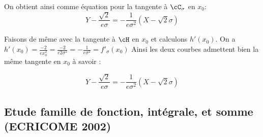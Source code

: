 \begin{correction}
\begin{enumerate}
\begin{enumerate}
On obtient ainsi comme équation pour la tangente à $\cC_\sigma$ en $x_0$:
$$Y- \frac{\sqrt{2}}{e\sigma} = - \frac{1}{e\sigma^2} (X- \sqrt{2}\sigma)$$

Faisons de même avec la tangente à $\cH$ en $x_0$ et calculons $h'(x_0)$. 
On  a $h'(x_0) =\frac{-2}{ex_0^2}= \frac{-2}{e 2 \sigma^2} =- \frac{1}{e\sigma^2} =f'_\sigma(x_0) $
Ainsi les deux courbes admettent bien la même tangente en $x_0$ à savoir :

$$Y- \frac{\sqrt{2}}{e\sigma} = - \frac{1}{e\sigma^2} (X- \sqrt{2}\sigma)$$

 
\end{enumerate}
\end{enumerate}
\end{correction}



















\subsection{Etude famille de fonction, intégrale, et somme (ECRICOME 2002)}

